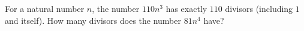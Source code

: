 For a natural number $n$, the number $110n^{3}$ has exactly $110$ divisors (including $1$ and itself). How many divisors does the number $81n^{4}$ have?
